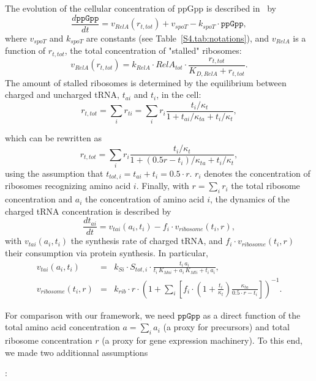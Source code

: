 \documentclass[a4paper,12pt]{article}
\newcommand{\tr}[1]{{#1}}
\begin{document}
\tr{The evolution of the cellular concentration of ppGpp is described in~\cite{bosdriesz_how_2015} by}
\begin{equation}
\label{eq:ppGpp}
\frac{d\texttt{ppGpp}}{dt} = v_{RelA}(r_{t,tot}) + v_{spoT} - k_{spoT} \cdot \texttt{ppGpp},
\end{equation}
\tr{where $v_{spoT}$ and $k_{spoT}$ are constants (see Table~\ref{S4.tab:notations}), and $v_{RelA}$ is a function of $r_{t,tot}$, the total concentration of "stalled" ribosomes:} 
\begin{equation}
\label{eq:vrelA}
v_{RelA}(r_{t,tot}) = k_{RelA} \cdot RelA_{tot} \cdot \frac{r_{t,tot}}{K_{D,RelA} + r_{t,tot}}.
\end{equation}
\tr{The amount of stalled ribosomes is determined by the equilibrium between charged and uncharged tRNA, $t_{ai}$ and $t_{i}$, in the cell:}
\begin{equation}
\label{eq:rttot}
r_{t,tot} = \sum_i r_{ti} = \sum_i r_i \frac{t_i/\kappa_{t}}{1+t_{ai}/\kappa_{ta}+t_i/\kappa_{t}},
\end{equation}
\tr{which can be rewritten as
\begin{equation}
\label{eq:rttot-f}
r_{t,tot} = \sum_i r_i \frac{t_i/\kappa_{t}}{1+(0.5 r-t_i)/\kappa_{ta}+t_i/\kappa_{t}},
\end{equation}
using the assumption that $t_{tot,i}  = t_{ai} + t_i = 0.5 \cdot r$.
$r_i$ denotes the concentration of ribosomes recognizing amino acid  $i$.
Finally, with $r = \sum_i r_i$ the total ribosome concentration and $a_i$ the concentration of amino acid $i$, the dynamics of the charged tRNA concentration is described by
\begin{equation}
\label{eq:ti_dynamic}
\frac{dt_{ai}}{dt} = v_{tai}(a_i, t_{i}) - f_i \cdot v_{ribosome}(t_i,r),
\end{equation}
with $v_{tai}(a_i, t_{i})$ the synthesis rate of charged tRNA, and $f_i \cdot v_{ribosome}(t_i,r)$ their consumption via protein synthesis.
In particular,
\begin{eqnarray}
v_{tai}(a_i, t_{i}) &=& k_{Si} \cdot S_{tot,i} \cdot \frac{t_i\, a_i}{t_i\,  K_{Mai} + a_i\,  K_{Mti} + t_i\,  a_i}, \label{eq:vtai}\\
v_{ribosome}(t_i, r) &=& k_{rib} \cdot r \cdot \left(1+ \sum_i \left[ f_i \cdot \left( 1 + \frac{t_i}{\kappa_t} \right) \frac{\kappa_{ta}}{0.5\cdot r - t_i} \right]\right)^{-1}. \label{eq:vrib}
\end{eqnarray}

For comparison with our framework, we need $\texttt{ppGpp}$ as a direct function of the total amino acid concentration $a = \sum_i a_i$ (a proxy for precursors) and total ribosome concentration $r$ (a proxy for gene expression machinery).
To this end, we made two additionnal assumptions}:
\end{document}
